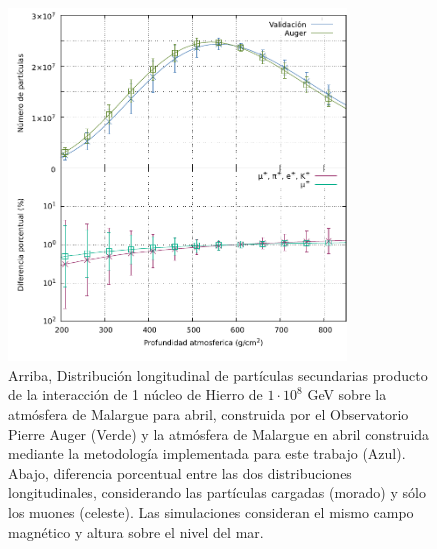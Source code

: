   \begin{figure}[htb!]
\centering
\includegraphics[width=0.8\textwidth]{Figs/longi_1E8_malargue.pdf}
\caption[Distribución longitudinal de secundarios sobre Malarg\"ue.]{Arriba, Distribución longitudinal de partículas secundarias producto de la interacción de 1 núcleo de Hierro de $1\cdot 10^{8}$ GeV sobre la atmósfera de Malargue para abril, construida por el Observatorio Pierre Auger (Verde) y la atmósfera de Malargue en abril construida mediante la metodología implementada para este trabajo (Azul). Abajo, diferencia porcentual entre las dos distribuciones longitudinales, considerando las partículas cargadas (morado) y sólo los muones (celeste). Las simulaciones consideran el mismo campo magnético y altura sobre el nivel del mar.}
 \label{fig:fig18}
 \end{figure}\\